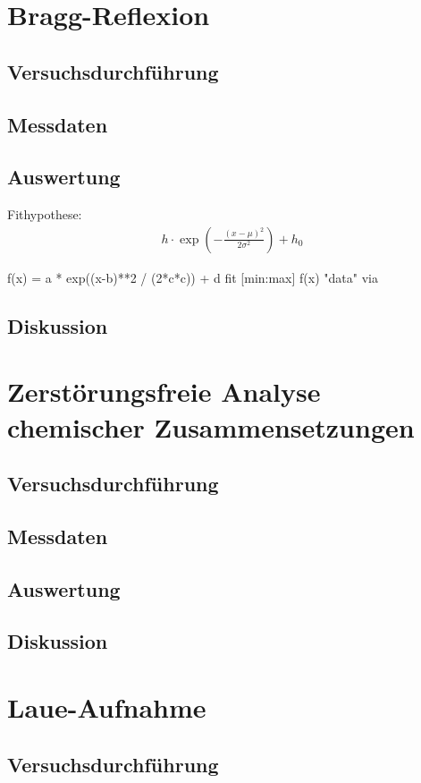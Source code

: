 \documentclass[10pt, a4paper]{article}
\begin{document}

\section{Bragg-Reflexion}
\subsection{Versuchsdurchführung}
\subsection{Messdaten}
\subsection{Auswertung}

Fithypothese:
\begin{align}
  h \cdot \exp\left(- \frac{(x-\mu)^2}{2\sigma^2}\right) + h_0
\end{align}

f(x) = a * exp((x-b)**2 / (2*c*c)) + d
fit [min:max] f(x) "data" via 

\subsection{Diskussion}

\section{Zerstörungsfreie Analyse chemischer Zusammensetzungen}
\subsection{Versuchsdurchführung}
\subsection{Messdaten}
\subsection{Auswertung}
\subsection{Diskussion}

\section{Laue-Aufnahme}
\subsection{Versuchsdurchführung}
\end{document}
